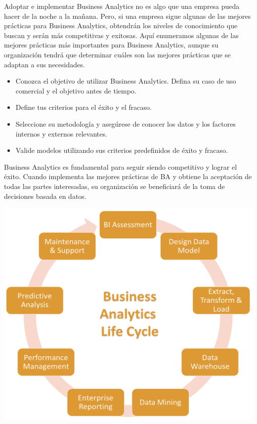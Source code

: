 Adoptar e implementar Business Analytics no es algo que una empresa pueda hacer de la noche a la mañana. Pero, si una empresa sigue algunas de las mejores prácticas para Business Analytics, obtendrán los niveles de conocimiento que buscan y serán más competitivas y exitosas. Aquí enumeramos algunas de las mejores prácticas más importantes para Business Analytics, aunque su organización tendrá que determinar cuáles son las mejores prácticas que se adaptan a sus necesidades.

\begin{itemize}
\item Conozca el objetivo de utilizar Business Analytics. Defina su caso de uso comercial y el objetivo antes de tiempo.
\item Define tus criterios para el éxito y el fracaso.
\item Seleccione su metodología y asegúrese de conocer los datos y los factores internos y externos relevantes.
\item Valide modelos utilizando sus criterios predefinidos de éxito y fracaso.
\end{itemize}

Business Analytics es fundamental para seguir siendo competitivo y lograr el éxito. Cuando implementa las mejores prácticas de BA y obtiene la aceptación de todas las partes interesadas, su organización se beneficiará de la toma de decisiones basada en datos.\newline

\begin{center}
\includegraphics[width=0.6\columnwidth]{images/ba/ba-lc}
\end{center}